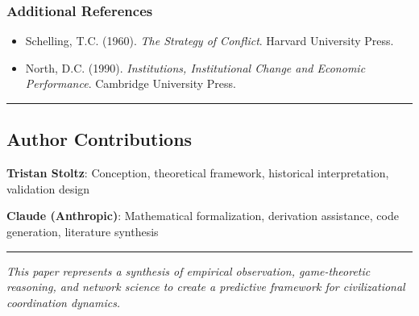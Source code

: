 \documentclass[11pt,letterpaper]{article}
\providecommand{\tightlist}{%
  \setlength{\itemsep}{0pt}\setlength{\parskip}{0pt}}
\begin{document}
\subsubsection{Additional References}\label{additional-references}

\begin{itemize}
\tightlist
\item
  Schelling, T.C. (1960). \emph{The Strategy of Conflict}. Harvard
  University Press.
\item
  North, D.C. (1990). \emph{Institutions, Institutional Change and
  Economic Performance}. Cambridge University Press.
\end{itemize}

\begin{center}\rule{0.5\linewidth}{0.5pt}\end{center}

\subsection{Author Contributions}\label{author-contributions}

\textbf{Tristan Stoltz}: Conception, theoretical framework, historical
interpretation, validation design

\textbf{Claude (Anthropic)}: Mathematical formalization, derivation
assistance, code generation, literature synthesis

\begin{center}\rule{0.5\linewidth}{0.5pt}\end{center}

\emph{This paper represents a synthesis of empirical observation,
game-theoretic reasoning, and network science to create a predictive
framework for civilizational coordination dynamics.}
\end{document}
